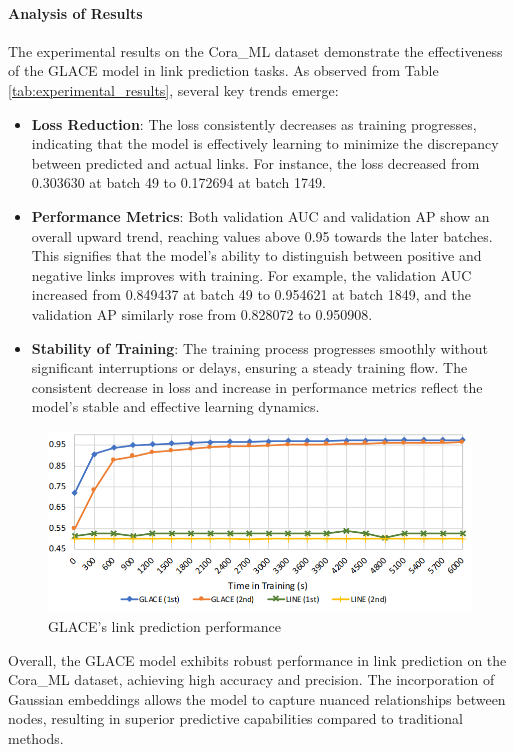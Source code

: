 \documentclass[11pt]{article}
\begin{document}
\paragraph{Analysis of Results}
The experimental results on the Cora\_ML dataset demonstrate the effectiveness of the GLACE model in link prediction tasks. As observed from Table \ref{tab:experimental_results}, several key trends emerge:

\begin{itemize}
    \item \textbf{Loss Reduction}: The loss consistently decreases as training progresses, indicating that the model is effectively learning to minimize the discrepancy between predicted and actual links. For instance, the loss decreased from 0.303630 at batch 49 to 0.172694 at batch 1749.
    
    \item \textbf{Performance Metrics}: Both validation AUC and validation AP show an overall upward trend, reaching values above 0.95 towards the later batches. This signifies that the model's ability to distinguish between positive and negative links improves with training. For example, the validation AUC increased from 0.849437 at batch 49 to 0.954621 at batch 1849, and the validation AP similarly rose from 0.828072 to 0.950908.
    
    \item \textbf{Stability of Training}: The training process progresses smoothly without significant interruptions or delays, ensuring a steady training flow. The consistent decrease in loss and increase in performance metrics reflect the model's stable and effective learning dynamics.
\end{itemize}
\begin{figure}
    \centering
    \includegraphics[width=0.9\linewidth]{img/link_prediction.jpg}
    \caption{GLACE's link prediction performance}
    \label{fig:enter-label}
\end{figure}
Overall, the GLACE model exhibits robust performance in link prediction on the Cora\_ML dataset, achieving high accuracy and precision. The incorporation of Gaussian embeddings allows the model to capture nuanced relationships between nodes, resulting in superior predictive capabilities compared to traditional methods.
\end{document}
